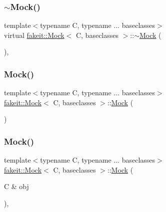 \subsubsection{\texorpdfstring{$\sim$Mock()}{~Mock()}\hspace{0.1cm}{\footnotesize\ttfamily [2/9]}}
{\footnotesize\ttfamily template$<$typename C, typename ... baseclasses$>$ \\
virtual \mbox{\hyperlink{classfakeit_1_1Mock}{fakeit\+::\+Mock}}$<$ C, baseclasses $>$\+::$\sim$\mbox{\hyperlink{classfakeit_1_1Mock}{Mock}} (\begin{DoxyParamCaption}{ }\end{DoxyParamCaption})\hspace{0.3cm}{\ttfamily [virtual]}, {\ttfamily [default]}}

\mbox{\label{classfakeit_1_1Mock_af7a86c609a2ee704ee09de6db066c7f4}} 
\subsubsection{\texorpdfstring{Mock()}{Mock()}\hspace{0.1cm}{\footnotesize\ttfamily [3/18]}}
{\footnotesize\ttfamily template$<$typename C, typename ... baseclasses$>$ \\
\mbox{\hyperlink{classfakeit_1_1Mock}{fakeit\+::\+Mock}}$<$ C, baseclasses $>$\+::\mbox{\hyperlink{classfakeit_1_1Mock}{Mock}} (\begin{DoxyParamCaption}{ }\end{DoxyParamCaption})\hspace{0.3cm}{\ttfamily [inline]}}

\mbox{\label{classfakeit_1_1Mock_aa474a0d6c7447608253a0fc306eb6ef5}} 
\subsubsection{\texorpdfstring{Mock()}{Mock()}\hspace{0.1cm}{\footnotesize\ttfamily [4/18]}}
{\footnotesize\ttfamily template$<$typename C, typename ... baseclasses$>$ \\
\mbox{\hyperlink{classfakeit_1_1Mock}{fakeit\+::\+Mock}}$<$ C, baseclasses $>$\+::\mbox{\hyperlink{classfakeit_1_1Mock}{Mock}} (\begin{DoxyParamCaption}\item[{C \&}]{obj }\end{DoxyParamCaption})\hspace{0.3cm}{\ttfamily [inline]}, {\ttfamily [explicit]}}

